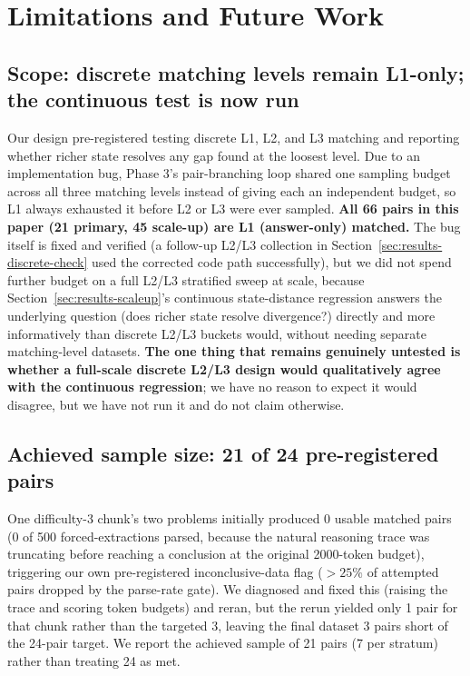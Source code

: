 \documentclass{article}
\begin{document}
\section{Limitations and Future Work}

\subsection{Scope: discrete matching levels remain L1-only; the continuous test is now run}
\label{sec:lim-scope}

Our design pre-registered testing discrete L1, L2, and L3 matching and reporting whether richer state resolves any gap found at the loosest level. Due to an implementation bug, Phase 3's pair-branching loop shared one sampling budget across all three matching levels instead of giving each an independent budget, so L1 always exhausted it before L2 or L3 were ever sampled. \textbf{All 66 pairs in this paper (21 primary, 45 scale-up) are L1 (answer-only) matched.} The bug itself is fixed and verified (a follow-up L2/L3 collection in Section~\ref{sec:results-discrete-check} used the corrected code path successfully), but we did not spend further budget on a full L2/L3 stratified sweep at scale, because Section~\ref{sec:results-scaleup}'s continuous state-distance regression answers the underlying question (does richer state resolve divergence?) directly and more informatively than discrete L2/L3 buckets would, without needing separate matching-level datasets. \textbf{The one thing that remains genuinely untested is whether a full-scale discrete L2/L3 design would qualitatively agree with the continuous regression}; we have no reason to expect it would disagree, but we have not run it and do not claim otherwise.

\subsection{Achieved sample size: 21 of 24 pre-registered pairs}
\label{sec:lim-samplesize}

One difficulty-3 chunk's two problems initially produced 0 usable matched pairs (0 of 500 forced-extractions parsed, because the natural reasoning trace was truncating before reaching a conclusion at the original 2000-token budget), triggering our own pre-registered inconclusive-data flag ($>25\%$ of attempted pairs dropped by the parse-rate gate). We diagnosed and fixed this (raising the trace and scoring token budgets) and reran, but the rerun yielded only 1 pair for that chunk rather than the targeted 3, leaving the final dataset 3 pairs short of the 24-pair target. We report the achieved sample of 21 pairs (7 per stratum) rather than treating 24 as met.
\end{document}
